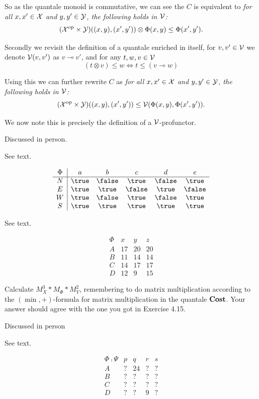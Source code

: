 So as the quantale monoid is commutative, we can see the $C$ is equivalent to \textit{for all $x,x'\in\mathcal{X}$ and $y,y'\in\mathcal{Y}$, the following holds in $\mathcal{V}$:}
$$(\mathcal{X}^{\textrm{op}}\times\mathcal{Y})((x,y),(x',y'))\otimes\Phi(x,y)\leq\Phi(x',y').$$

Secondly we revisit the definition of a quantale enriched in itself, for $v,v'\in \mathcal{V}$ we denote $\mathcal{V}(v,v')$ as  $v\multimap v'$, and for any $t,w,v\in \mathcal{V}$
 $$(t\otimes v)\leq w \iff t\leq (v\multimap w)$$
 
Using this we can further rewrite $C$ as \textit{for all $x,x'\in\mathcal{X}$ and $y,y'\in\mathcal{Y}$, the following holds in $\mathcal{V}$:}
$$(\mathcal{X}^{\textrm{op}}\times\mathcal{Y})((x,y),(x',y'))\leq\mathcal{V}(\Phi(x,y),\Phi(x',y')).$$

We now note this is precisely the definition of a $\mathcal{V}$-profunctor.

Discussed in person.

See text.

\solution
$$\begin{array}{c|ccccc}
\Phi & a & b & c & d & e \\
\hline N & \true & \false & \true & \false & \true \\
E & \true & \true & \false & \true & \false \\
W & \true & \false & \true & \false & \true \\
S & \true & \true & \true & \true & \true
\end{array}$$

See text.

\solution
$$\begin{array}{c|ccc}
\Phi & x & y & z \\
\hline A & 17 & 20 & 20 \\
B & 11 & 14 & 14 \\
C & 14 & 17 & 17 \\
D & 12 & 9 & 15
\end{array}$$

Calculate $M_X^3*M_\Phi*M_Y^2$, remembering to do matrix multiplication according to the $(\min,+)$-formula for matrix multiplication in the quantale $\textbf{Cost}$.  Your answer should agree with the one you got in Exercise 4.15.

\solution

Discussed in person

See text.

\solution
$$\begin{array}{c|cccc}
\Phi \fcmp \Psi & p & q & r & s \\
\hline A & ? & 24 & ? & ? \\
B & ? & ? & ? & ? \\
C & ? & ? & ? & ? \\
D & ? & ? & 9 & ?
\end{array}$$

